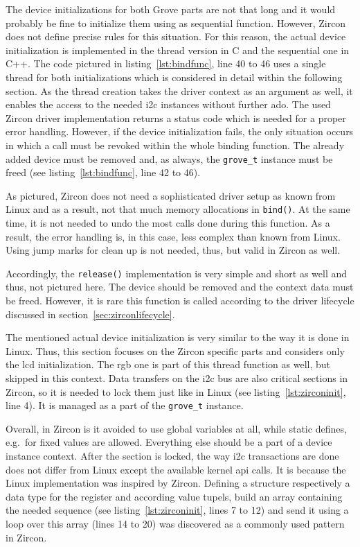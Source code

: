 The device initializations for both Grove parts are not that long and it would probably be fine to initialize them using as sequential function.
However, Zircon does not define precise rules for this situation.
For this reason, the actual device initialization is implemented in the thread version in C and the sequential one in C++.
The code pictured in listing~\ref{lst:bindfunc}, line 40 to 46 uses a single thread for both initializations which is considered in detail within the following section.
As the thread creation takes the driver context as an argument as well, it enables the access to the needed \ac{i2c} instances without further ado.
The used Zircon driver implementation returns a status code which is needed for a proper error handling.
However, if the device initialization fails, the only situation occurs in which a call must be revoked within the whole binding function.
The already added device must be removed and, as always, the \texttt{grove_t} instance must be freed (see listing~\ref{lst:bindfunc}, line 42 to 46).

As pictured, Zircon does not need a sophisticated driver setup as known from Linux and as a result, not that much memory allocations in \texttt{bind()}.
At the same time, it is not needed to undo the most calls done during this function.
As a result, the error handling is, in this case, less complex than known from Linux.
Using jump marks for clean up is not needed, thus, but valid in Zircon as well.

Accordingly, the \texttt{release()} implementation is very simple and short as well and thus, not pictured here.
The device should be removed and the context data must be freed.
However, it is rare this function is called according to the driver lifecycle discussed in section~\ref{sec:zirconlifecycle}.

The mentioned actual device initialization is very similar to the way it is done in Linux.
Thus, this section focuses on the Zircon specific parts and considers only the \ac{lcd} initialization.
The \ac{rgb} one is part of this thread function as well, but skipped in this context.
Data transfers on the \ac{i2c} bus are also critical sections in Zircon, so it is needed to lock them just like in Linux (see listing~\ref{lst:zirconinit}, line 4).
It is managed as a part of the \texttt{grove_t} instance.

Overall, in Zircon is it avoided to use global variables at all, while static defines, e.g.\ for fixed values are allowed.
Everything else should be a part of a device instance context.
After the section is locked, the way \ac{i2c} transactions are done does not differ from Linux except the available kernel \ac{api} calls.
It is because the Linux implementation was inspired by Zircon.
Defining a structure respectively a data type for the register and according value tupels, build an array containing the needed sequence (see listing~\ref{lst:zirconinit}, lines 7 to 12) and send it using a loop over this array (lines 14 to 20) was discovered as a commonly used pattern in Zircon.

